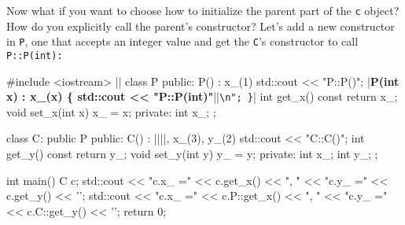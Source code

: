 Now what if you want to choose how to initialize the parent part of the
\verb!c! object? How do you explicitly call the parent's constructor?
Let's add a new constructor in \verb!P!, one that accepts an integer
value and get the \verb!C!'s constructor to call \verb!P::P(int):!
\begin{consolethree}[escapeinside=||]
#include <iostream>
||
class P
{
public:
        P() : x_(1) { std::cout << "P::P()\n"; }
        |\textbf{P(int x) : x\_(x) \{ std::cout << "P::P(int)"}||\verb!\n"; }!|
        int get_x() const { return x_; }
        void set_x(int x) { x_ = x; }
private:
        int x_;
};

class C: public P
{
public:
        C() : ||||, x_(3), y_(2)
                     { std::cout << "C::C()"; }
        int get_y() const { return y_; }
        void set_y(int y) { y_ = y; }
private:
        int x_;
        int y_;
};

int main()
{   
    C c;
    std::cout << "c.x_ =" << c.get_x() << ", "
              << "c.y_ =" << c.get_y() << '\n';
    std::cout << "c.x_ =" << c.P::get_x() << ", "
              << "c.y_ =" << c.C::get_y() << '\n';
    return 0;
}
\end{consolethree}

